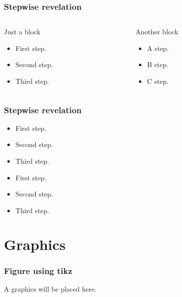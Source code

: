 \documentclass[11pt]{beamer}
\begin{document}
\begin{frame}
  \frametitle{Stepwise revelation}
  \begin{columns}
    \begin{column}{.5\textwidth}
      \begin{block}{Just a block}
        \begin{itemize}
        \item<1-> First step.
        \item<2-> Second step.
        \item<3-> Third step.
        \end{itemize}
      \end{block}
    \end{column}
    \begin{column}{.5\textwidth}
      \begin{alertblock}{Another block}
        \begin{itemize}
        \item<1-> A step.
        \item<2-> B step.
        \item<3-> C step.
        \end{itemize}
      \end{alertblock}
    \end{column}
  \end{columns}
\end{frame}

\begin{frame}
  \frametitle{Stepwise revelation}
  \begin{minipage}{.45\linewidth}
    \begin{itemize}[<+->]
    \item First step.
    \item Second step.
    \item Third step.
    \end{itemize}
  \end{minipage}
  \begin{minipage}{.45\linewidth}
    \begin{itemize}[<+- | alert@+>]
    \item First step.
    \item Second step.
    \item Third step.
    \end{itemize}
  \end{minipage}
\end{frame}

\section{Graphics}
\begin{frame}
  \frametitle{Figure using tikz}
  \begin{center}
    A graphics will be placed here.
  \end{center}
\end{frame}
\end{document}
